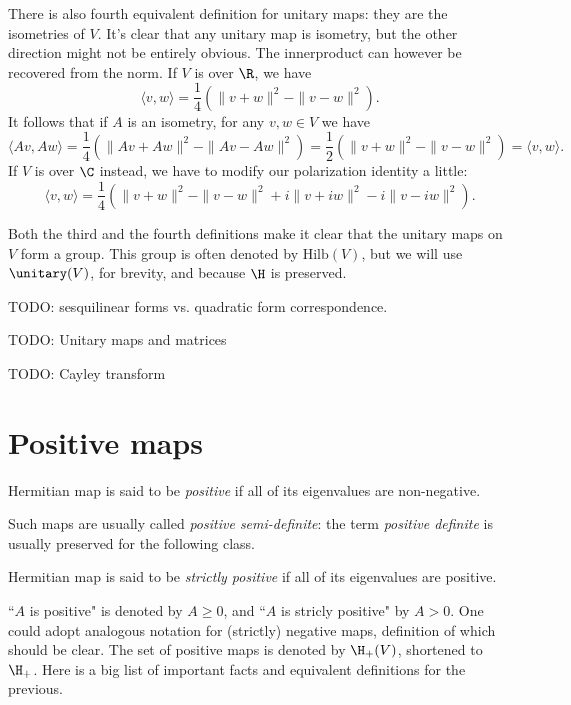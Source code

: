 There is also fourth equivalent definition for unitary maps: they are the isometries of $V$. It's clear that any unitary map is isometry, but the other direction might not be entirely obvious. The innerproduct can however be recovered from the norm. If $V$ is over $\R$, we have
\[
\langle v, w \rangle = \frac{1}{4} \left(\|v + w\|^{2} - \|v - w\|^{2} \right).
\]
It follows that if $A$ is an isometry, for any $v, w \in V$ we have
\[
\langle Av, Aw \rangle = \frac{1}{4} \left(\|Av + Aw\|^{2} - \|Av - Aw\|^{2} \right) = \frac{1}{2} \left(\|v + w\|^{2} - \|v - w\|^{2} \right) = \langle v, w \rangle.
\]
If $V$ is over $\C$ instead, we have to modify our polarization identity a little:
\[
\langle v, w \rangle = \frac{1}{4} \left(\|v + w\|^{2} - \|v - w\|^{2} + i \|v + i w \|^{2} - i \|v - i w\|^{2}\right).
\]

Both the third and the fourth definitions make it clear that the unitary maps on $V$ form a group. This group is often denoted by $\text{Hilb}(V)$, but we will use $\unitary(V)$, for brevity, and because $\H$ is preserved.

TODO: sesquilinear forms vs. quadratic form correspondence.

TODO: Unitary maps and matrices

TODO: Cayley transform

\section{Positive maps}

\begin{maar}
	Hermitian map is said to be \textit{positive} if all of its eigenvalues are non-negative.
\end{maar}

Such maps are usually called \textit{positive semi-definite}: the term \textit{positive definite} is usually preserved for the following class.

\begin{maar}
	Hermitian map is said to be \textit{strictly positive} if all of its eigenvalues are positive.
\end{maar}

``$A$ is positive" is denoted by $A \geq 0$, and ``$A$ is stricly positive" by $A > 0$. One could adopt analogous notation for (strictly) negative maps, definition of which should be clear. The set of positive maps is denoted by $\H_{+}(V)$, shortened to $\H_{+}$. Here is a big list of important facts and equivalent definitions for the previous.

